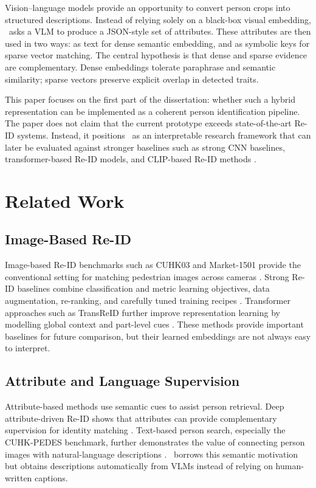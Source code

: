 Vision--language models provide an opportunity to convert person crops into structured descriptions. Instead of relying solely on a black-box visual embedding, \systemname\ asks a VLM to produce a JSON-style set of attributes. These attributes are then used in two ways: as text for dense semantic embedding, and as symbolic keys for sparse vector matching. The central hypothesis is that dense and sparse evidence are complementary. Dense embeddings tolerate paraphrase and semantic similarity; sparse vectors preserve explicit overlap in detected traits.

This paper focuses on the first part of the dissertation: whether such a hybrid representation can be implemented as a coherent person identification pipeline. The paper does not claim that the current prototype exceeds state-of-the-art Re-ID systems. Instead, it positions \systemname\ as an interpretable research framework that can later be evaluated against stronger baselines such as strong CNN baselines, transformer-based Re-ID models, and CLIP-based Re-ID methods \citep{luo2019bag,he2021transreid,li2023clipreid}.

\section{Related Work}

\subsection{Image-Based Re-ID}

Image-based Re-ID benchmarks such as CUHK03 and Market-1501 provide the conventional setting for matching pedestrian images across cameras \citep{li2014deepreid,zheng2015scalable}. Strong Re-ID baselines combine classification and metric learning objectives, data augmentation, re-ranking, and carefully tuned training recipes \citep{luo2019bag}. Transformer approaches such as TransReID further improve representation learning by modelling global context and part-level cues \citep{he2021transreid}. These methods provide important baselines for future comparison, but their learned embeddings are not always easy to interpret.

\subsection{Attribute and Language Supervision}

Attribute-based methods use semantic cues to assist person retrieval. Deep attribute-driven Re-ID shows that attributes can provide complementary supervision for identity matching \citep{su2016deep}. Text-based person search, especially the CUHK-PEDES benchmark, further demonstrates the value of connecting person images with natural-language descriptions \citep{li2017personsearch}. \systemname\ borrows this semantic motivation but obtains descriptions automatically from VLMs instead of relying on human-written captions.


